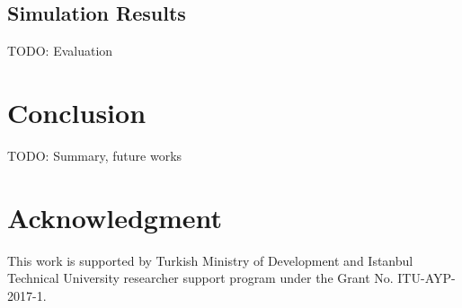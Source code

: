 \documentclass[conference]{IEEEtran}
\begin{document}
\subsection{Simulation Results}
TODO: Evaluation


\section{Conclusion} \label{Conclusion}
TODO: Summary, future works
\cite{7815384} \cite{7803607} \cite{7996384} \cite{8090518} \cite{s17061193} \cite{8267219} \cite{8430542} \cite{8319183} \cite{8480649} \cite{AN1200.22} \cite{Bor:2016:LLW:2988287.2989163} \cite{8406255} \cite{DBLP:journals/corr/abs-1802-10338} \cite{finnegan2018comparative}


\section*{Acknowledgment}
This work is supported by Turkish Ministry of Development and Istanbul Technical University researcher support program under the Grant No. ITU-AYP-2017-1.




\end{document}
